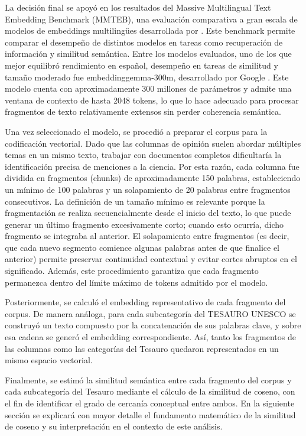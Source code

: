 \documentclass[11pt,a4paper]{article}
\begin{document}
La decisión final se apoyó en los resultados del Massive Multilingual Text Embedding Benchmark (MMTEB), una evaluación comparativa a gran escala de modelos de embeddings multilingües desarrollada por \cite{enevoldsen2025mmtebmassivemultilingualtext}. Este benchmark permite comparar el desempeño de distintos modelos en tareas como recuperación de información y similitud semántica. Entre los modelos evaluados, uno de los que mejor equilibró rendimiento en español, desempeño en tareas de similitud y tamaño moderado fue embeddinggemma-300m, desarrollado por Google \cite{vera2025embeddinggemmapowerfullightweighttext}. Este modelo cuenta con aproximadamente 300 millones de parámetros y admite una ventana de contexto de hasta 2048 tokens, lo que lo hace adecuado para procesar fragmentos de texto relativamente extensos sin perder coherencia semántica.

Una vez seleccionado el modelo, se procedió a preparar el corpus para la codificación vectorial. Dado que las columnas de opinión suelen abordar múltiples temas en un mismo texto, trabajar con documentos completos dificultaría la identificación precisa de menciones a la ciencia. Por esta razón, cada columna fue dividida en fragmentos (chunks) de aproximadamente 150 palabras, estableciendo un mínimo de 100 palabras y un solapamiento de 20 palabras entre fragmentos consecutivos. La definición de un tamaño mínimo es relevante porque la fragmentación se realiza secuencialmente desde el inicio del texto, lo que puede generar un último fragmento excesivamente corto; cuando esto ocurría, dicho fragmento se integraba al anterior. El solapamiento entre fragmentos (es decir, que cada nuevo segmento comience algunas palabras antes de que finalice el anterior) permite preservar continuidad contextual y evitar cortes abruptos en el significado. Además, este procedimiento garantiza que cada fragmento permanezca dentro del límite máximo de tokens admitido por el modelo.

Posteriormente, se calculó el embedding representativo de cada fragmento del corpus. De manera análoga, para cada subcategoría del TESAURO UNESCO se construyó un texto compuesto por la concatenación de sus palabras clave, y sobre esa cadena se generó el embedding correspondiente. Así, tanto los fragmentos de las columnas como las categorías del Tesauro quedaron representados en un mismo espacio vectorial.

Finalmente, se estimó la similitud semántica entre cada fragmento del corpus y cada subcategoría del Tesauro mediante el cálculo de la similitud de coseno, con el fin de identificar el grado de cercanía conceptual entre ambos. En la siguiente sección se explicará con mayor detalle el fundamento matemático de la similitud de coseno y su interpretación en el contexto de este análisis.
\end{document}
